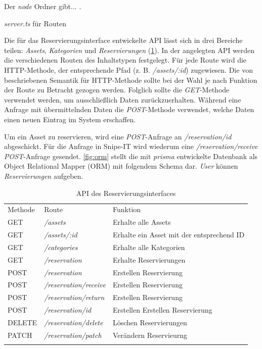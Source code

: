 Der \textit{node} Ordner gibt... .



\textit{server.ts} für Routen


Die für das Reservierungsinterface entwickelte API lässt sich in drei Bereiche teilen:
\textit{Assets}, \textit{Kategorien} und \textit{Reservierungen} (\ref{table:impl-backend-routes}).
In der angelegten API werden die verschiedenen Routen des Inhaltstypen festgelegt. Für jede Route
wird die HTTP-Methode, der entsprechende Pfad (z. B. \textit{/assets/:id}) zugewiesen. Die von
 beschriebenen Semantik für HTTP-Methode sollte bei der Wahl je nach
Funktion der Route zu Betracht gezogen werden. Folglich sollte die \textit{GET}-Methode verwendet
werden, um ausschließlich Daten zurückzuerhalten. Während eine Anfrage mit übermittelnden Daten die
\textit{POST}-Methode verwendet, welche Daten einen neuen Eintrag im System erschaffen.

Um ein Asset zu reservieren, wird eine \textit{POST}-Anfrage an \textit{/reservation/id}
abgeschickt. Für die Anfrage in Snipe-IT wird wiederum eine \textit{/reservation/receive}
\textit{POST}-Anfrage gesendet. \ref{fig:orm} stellt die mit \textit{prisma} entwickelte Datenbank
als Object Relational Mapper (ORM) mit folgendem Schema dar. \textit{User} können
\textit{Reservierungen} aufgeben.


\begin{table}[h]
  \centering
  \caption{API des Reservierungsinterfaces}
  \begin{tabular}{lll}
    \arrayrulecolor{maincolor}\hline
    \sffamily\color{maincolor}Methode & \sffamily\color{maincolor}Route           &
    \sffamily\color{maincolor}Funktion             \\
    \arrayrulecolor{maincolor}\hline
      GET               & \textit{/assets}       & Erhalte alle Assets \\
      GET               & \textit{/assets/:id}   & Erhalte ein Asset mit der entsprechend ID
      \\
      GET               & \textit{/categories} & Erhalte alle Kategorien
      \\
      GET               & \textit{/reservation} & Erhalte Reservierungen
      \\
      POST              & \textit{/reservation}       & Erstellen Reservierung
      \\
      POST              & \textit{/reservation/receive}       & Erstellen Reservierung
      \\
      POST              & \textit{/reservation/return}       & Erstellen Reservierung
      \\
      POST              & \textit{/reservation/id}       & Erstellen Erstellen Reservierung
      \\
      DELETE            & \textit{/reservation/delete}   & Löschen Reservierungen
      \\
      PATCH               & \textit{/reservation/patch}   & Verändern Reservieurng       \\
    \arrayrulecolor{maincolor}\hline
  \end{tabular}
  \label{table:impl-backend-routes}
\end{table}

